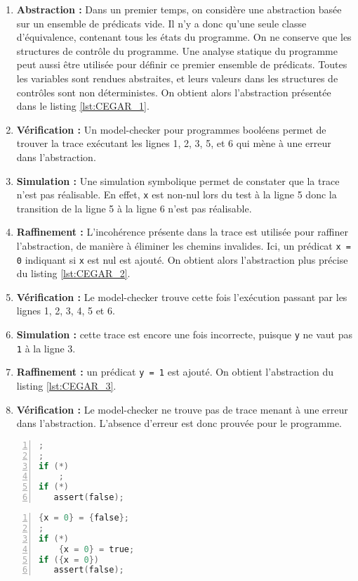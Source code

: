 \begin{enumerate}
\def\labelenumi{\arabic{enumi})}
\item
  \textbf{Abstraction :} Dans un premier temps, on considère une abstraction
  basée sur un ensemble de prédicats vide. Il n'y a donc qu'une seule classe
  d'équivalence, contenant tous les états du programme. On ne conserve que les
  structures de contrôle du programme. Une analyse statique du programme peut
  aussi être utilisée pour définir ce premier ensemble de prédicats.
  Toutes les variables sont rendues abstraites, et leurs valeurs dans
  les structures de contrôles sont non déterministes. On obtient alors
  l'abstraction présentée dans le listing \ref{lst:CEGAR_1}.
\item
  \textbf{Vérification :} Un model-checker pour programmes booléens permet de
  trouver la trace exécutant les lignes 1, 2, 3, 5, et 6 qui mène à une erreur
  dans l'abstraction.
\item
  \textbf{Simulation :} Une simulation symbolique permet de constater que la
  trace n'est pas réalisable. En effet, \texttt{x} est non-nul lors
  du test à la ligne 5 donc la transition de la ligne 5 à la ligne 6 n'est pas
  réalisable.
\item
  \textbf{Raffinement :} L'incohérence présente dans la trace est utilisée pour
  raffiner l'abstraction, de manière à éliminer les chemins invalides. Ici, un
  prédicat \texttt{{x = 0}} indiquant si \texttt{x} est nul est ajouté. On
  obtient alors l'abstraction plus précise du listing \ref{lst:CEGAR_2}.
\item
  \textbf{Vérification :} Le model-checker trouve cette fois l'exécution
  passant par les lignes 1, 2, 3, 4, 5 et 6.
\item
  \textbf{Simulation :} cette trace est encore une fois incorrecte, puisque
  \texttt{y} ne vaut pas \texttt{1} à la ligne 3.
\item
  \textbf{Raffinement :} un prédicat \texttt{{y = 1}} est ajouté. On obtient
  l'abstraction du listing \ref{lst:CEGAR_3}.
\item
  \textbf{Vérification :} Le model-checker ne trouve pas de trace menant à une
  erreur dans l'abstraction. L'absence d'erreur est donc prouvée pour le
  programme.
\end{enumerate}

\noindent\begin{minipage}{.45\textwidth}
  \begin{lstlisting}[language=C, label=lst:CEGAR_1, numbers=left, frame=single,
    caption=Abstraction initiale]
;
;
if (*)
    ;
if (*)
   assert(false);
\end{lstlisting}
\end{minipage}\hfill
\begin{minipage}{.45\textwidth}
  \begin{lstlisting}[language=C, label=lst:CEGAR_2, numbers=left, frame=single,
    caption=Premier raffinement]
{x = 0} = {false};
;
if (*)
    {x = 0} = true;
if ({x = 0})
   assert(false);
\end{lstlisting}
\end{minipage}

